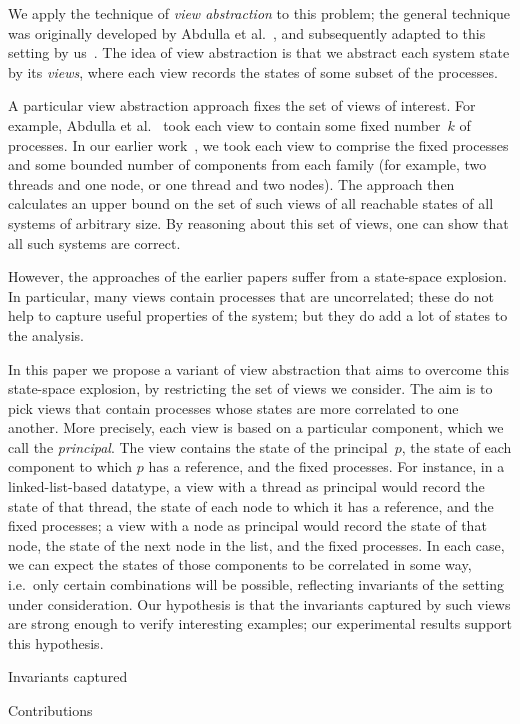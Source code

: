 We apply the technique of \emph{view abstraction} to this problem; the general
technique was originally developed by Abdulla et al.~\cite{AHH}, and
subsequently adapted to this setting by us~\cite{gavin:view-abs}.  The idea of
view abstraction is that we abstract each system state by its \emph{views},
where each view records the states of some subset of the processes.

A particular view abstraction approach fixes the set of views of interest.
For example, Abdulla et al.~\cite{AHH} took each view to contain some fixed
number~$k$ of processes.  In our earlier work~\cite{gavin:view-abs}, we took
each view to comprise the fixed processes and some bounded number of
components from each family (for example, two threads and one node, or one
thread and two nodes).  The approach then calculates an upper bound on the set
of such views of all reachable states of all systems of arbitrary size.  By
reasoning about this set of views, one can show that all such systems are
correct.

However, the approaches of the earlier papers suffer from a state-space
explosion.  In particular, many views contain processes that are uncorrelated;
these do not help to capture useful properties of the system; but they do add
a lot of states to the analysis.

In this paper we propose a variant of view abstraction that aims to overcome
this state-space explosion, by restricting the set of views we consider.  The
aim is to pick views that contain processes whose states are more correlated
to one another.  More precisely, each view is based on a particular component,
which we call the \emph{principal}.  The view contains the state of the
principal~$p$, the state of each component to which $p$ has a reference, and
the fixed processes.  For instance, in a linked-list-based datatype, a view
with a thread as principal would record the state of that thread, the state of
each node to which it has a reference, and the fixed processes; a view with a
node as principal would record the state of that node, the state of the next
node in the list, and the fixed processes.  In each case, we can expect the
states of those components to be correlated in some way, i.e.~only certain
combinations will be possible, reflecting invariants of the setting under
consideration.  Our hypothesis is that the invariants captured by such views
are strong enough to verify interesting examples; our experimental results
support this hypothesis. 




Invariants captured

Contributions


